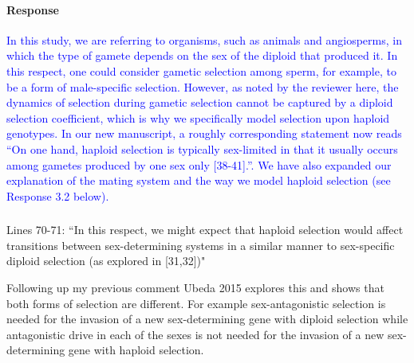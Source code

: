 \documentclass[10pt,letterpaper]{article}
\begin{document}
\noindent\paragraph{Response}
\textcolor{blue}{In this study, we are referring to organisms, such as animals and angiosperms, in which the type of gamete depends on the sex of the diploid that produced it. In this respect, one could consider gametic selection among sperm, for example, to be a form of male-specific selection. 
However, as noted by the reviewer here, the dynamics of selection during gametic selection cannot be captured by a diploid selection coefficient, which is why we specifically model selection upon haploid genotypes.
In our new manuscript, a roughly corresponding statement now reads ``On one hand, haploid selection is typically sex-limited in that it usually occurs among gametes produced by one sex only [38-41].''.
We have also expanded our explanation of the mating system and the way we model haploid selection (see Response 3.2 below).
}

\noindent\subsubsection{}
Lines 70-71: ``In this respect, we might expect that haploid selection would affect transitions between sex-determining systems in a similar manner to sex-specific diploid selection (as explored in [31,32])" 

Following up my previous comment Ubeda 2015 explores this and shows that both forms of selection are different. For example sex-antagonistic selection is needed for the invasion of a new sex-determining gene with diploid selection while antagonistic drive in each of the sexes is not needed for the invasion of a new sex-determining gene with haploid selection.
\end{document}
